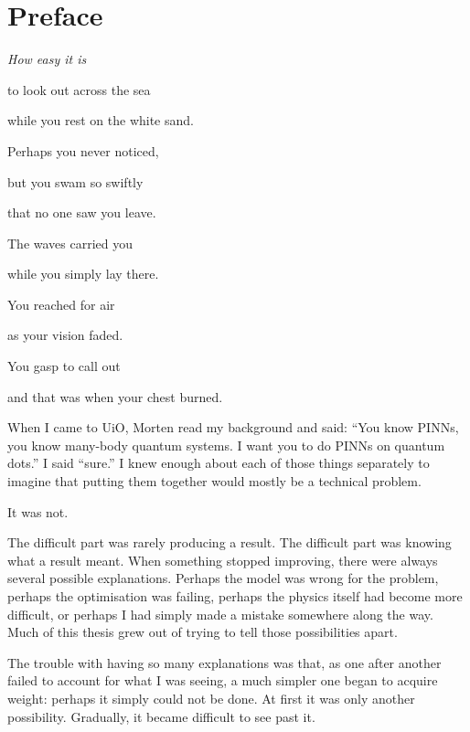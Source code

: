 \begingroup
\let\clearpage\relax
\let\cleardoublepage\relax
\chapter*{Preface}
\endgroup
{}

\vspace{1.5em}
\begin{center}
\begin{minipage}{0.62\textwidth}
\centering
\itshape
How easy it is\par
to look out across the sea\par
while you rest on the white sand.\par\medskip
Perhaps you never noticed,\par
but you swam so swiftly\par
that no one saw you leave.\par\medskip
The waves carried you\par
while you simply lay there.\par
You reached for air\par
as your vision faded.\par\medskip
You gasp to call out\par
and that was when your chest burned.
\end{minipage}
\end{center}
\vspace{2em}

When I came to UiO, Morten read my background and said: ``You know PINNs, you know
many-body quantum systems. I want you to do PINNs on quantum dots.'' I said
``sure.'' I knew enough about each of those things separately to imagine that putting
them together would mostly be a technical problem.

It was not.

The difficult part was rarely producing a result. The difficult part was knowing what
a result meant. When something stopped improving, there were always several possible
explanations. Perhaps the model was wrong for the problem, perhaps the optimisation was
failing, perhaps the physics itself had become more difficult, or perhaps I had simply
made a mistake somewhere along the way. Much of this thesis grew out of trying to tell
those possibilities apart.

The trouble with having so many explanations was that, as one after another failed to
account for what I was seeing, a much simpler one began to acquire weight: perhaps it
simply could not be done. At first it was only another possibility. Gradually, it became
difficult to see past it.

